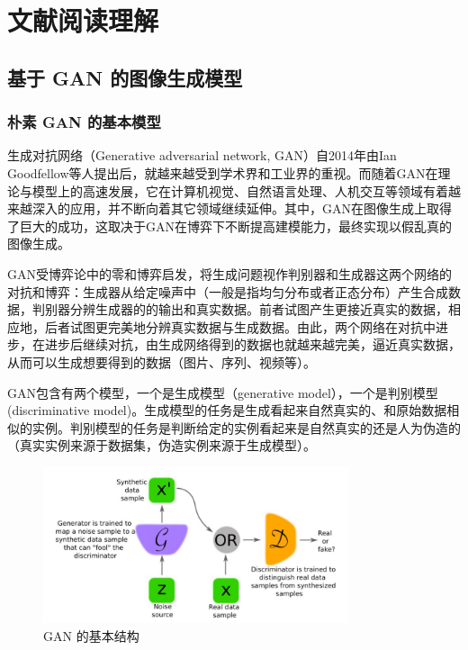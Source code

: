 \chapter{文献阅读理解}
\label{chap:2}

\section{基于 GAN 的图像生成模型}



\subsection{朴素 GAN 的基本模型}

生成对抗网络（Generative adversarial network, GAN）自2014年由Ian Goodfellow等人提出后，就越来越受到学术界和工业界的重视。而随着GAN在理论与模型上的高速发展，它在计算机视觉、自然语言处理、人机交互等领域有着越来越深入的应用，并不断向着其它领域继续延伸。其中，GAN在图像生成上取得了巨大的成功，这取决于GAN在博弈下不断提高建模能力，最终实现以假乱真的图像生成。

GAN受博弈论中的零和博弈启发，将生成问题视作判别器和生成器这两个网络的对抗和博弈：生成器从给定噪声中（一般是指均匀分布或者正态分布）产生合成数据，判别器分辨生成器的的输出和真实数据。前者试图产生更接近真实的数据，相应地，后者试图更完美地分辨真实数据与生成数据。由此，两个网络在对抗中进步，在进步后继续对抗，由生成网络得到的数据也就越来越完美，逼近真实数据，从而可以生成想要得到的数据（图片、序列、视频等）。

GAN包含有两个模型，一个是生成模型（generative model），一个是判别模型(discriminative model)。生成模型的任务是生成看起来自然真实的、和原始数据相似的实例。判别模型的任务是判断给定的实例看起来是自然真实的还是人为伪造的（真实实例来源于数据集，伪造实例来源于生成模型）。

\begin{figure}[htb]
\centering 
\includegraphics[width=0.8\textwidth]{img/m2t1.png} 
\caption{GAN 的基本结构}
\label{Test}
\end{figure}

